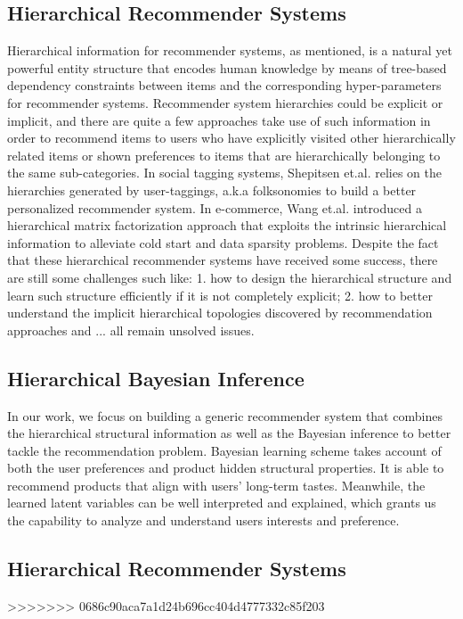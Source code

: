 \subsection{Hierarchical Recommender Systems}
Hierarchical information for recommender systems, as mentioned, is a natural yet powerful entity structure that encodes human knowledge by means of tree-based dependency constraints between items and the corresponding hyper-parameters for recommender systems.  Recommender system hierarchies could be explicit or implicit, and there are quite a few approaches take use of such information in order to recommend items to users who have explicitly visited other hierarchically related items or shown preferences to items that are hierarchically belonging to the same sub-categories.  In social tagging systems, Shepitsen et.al. \cite{shepitsen2008personalized} relies on the hierarchies generated by user-taggings, a.k.a folksonomies to build a better personalized recommender system.  In e-commerce, Wang et.al. \cite{wang2018exploring} introduced a hierarchical matrix factorization approach that exploits the intrinsic hierarchical information to alleviate cold start and data sparsity problems.  Despite the fact that these hierarchical recommender systems have received some success, there are still some challenges such like: 1. how to design the hierarchical structure and learn such structure efficiently if it is not completely explicit; 2. how to better understand the implicit hierarchical topologies discovered by recommendation approaches and ... all remain unsolved issues.

\subsection{Hierarchical Bayesian Inference}
In our work, we focus on building a generic recommender system that combines the hierarchical structural information as well as the Bayesian inference to better tackle the recommendation problem.  Bayesian learning scheme takes account of both the user preferences and product hidden structural properties. It is able to recommend products that align with users' long-term tastes. Meanwhile, the learned latent variables can be well interpreted and explained, which grants us the capability to analyze and understand users interests and preference.

\subsection{Hierarchical Recommender Systems}


>>>>>>> 0686c90aca7a1d24b696cc404d4777332c85f203
